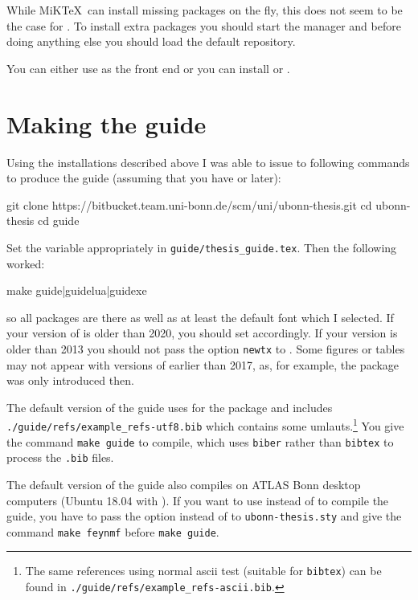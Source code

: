 While MiK\TeX\ can install missing packages on the fly, this does not
seem to be the case for \TeXLive. To install extra packages you should
start the \TeXLive manager and before doing anything else you should
load the default repository.

You can either use \TeXworks as the front end or you can install
\TeXstudio or \TeXmaker.


\section{Making the guide}%
\label{sec:app:guide}

Using the installations described above I was able to issue to following commands to
produce the guide (assuming that you have  or later):
\begin{bashlisting}
git clone https://bitbucket.team.uni-bonn.de/scm/uni/ubonn-thesis.git
cd ubonn-thesis
cd guide
\end{bashlisting}
\noindent Set the  variable appropriately in \texttt{guide/thesis\_guide.tex}.
\noindent Then the following worked:
\begin{bashlisting}
make guide|guidelua|guidexe
\end{bashlisting}
so all packages are there as well as at least the default font which I selected.
If your version of \TeXLive is older than 2020, you should set  accordingly.
If your version is older than 2013 you should not pass the option \texttt{newtx} to .
Some figures or tables may not appear with versions of \TeXLive earlier than 2017,
as, for example, the  package was only introduced then.

The default version of the guide uses  for the
 package and includes\\
\texttt{./guide/refs/example\_refs-utf8.bib} which contains some umlauts.\footnote{%
The same references using normal ascii test (suitable for \texttt{bibtex}) can be found in
\texttt{./guide/refs/example\_refs-ascii.bib}.}
You give the command \texttt{make guide} to compile, which uses \texttt{biber} rather than
\texttt{bibtex} to process the \texttt{.bib} files.

The default version of the guide also compiles on ATLAS Bonn desktop
computers (Ubuntu 18.04 with ). %
If you want to use
 instead of  to compile the guide, you
have to pass the option  instead of  to \texttt{ubonn-thesis.sty} 
and give the command \texttt{make feynmf} before \texttt{make guide}.

